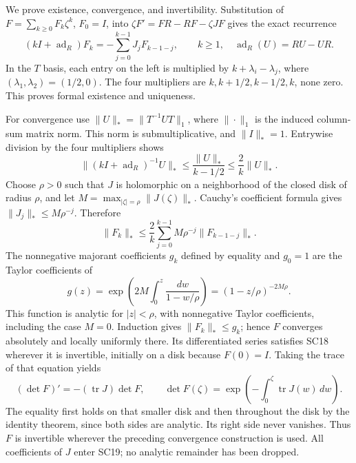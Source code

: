 We prove existence, convergence, and invertibility. Substitution
of \(F=\sum_{k\ge0}F_k\zeta^k\), \(F_0=I\), into
\(\zeta F'=FR-RF-\zeta JF\) gives the exact recurrence
\[
 (kI+\operatorname{ad}_R)F_k
   =-\sum_{j=0}^{k-1}J_jF_{k-1-j},\qquad k\ge1,
 \quad \operatorname{ad}_R(U)=RU-UR .
 \tag{SC19}
\]
In the \(T\) basis, each entry on the left is multiplied by
\(k+\lambda_i-\lambda_j\), where
\((\lambda_1,\lambda_2)=(1/2,0)\). The four multipliers are
\(k,k+1/2,k-1/2,k\), none zero. This proves formal existence
and uniqueness.

For convergence use
\(\|U\|_*=\|T^{-1}UT\|_1\), where \(\|\cdot\|_1\) is the
induced column-sum matrix norm. This norm is submultiplicative,
and \(\|I\|_*=1\). Entrywise division by the four multipliers
shows
\[
 \|(kI+\operatorname{ad}_R)^{-1}U\|_*
 \le\frac{\|U\|_*}{k-1/2}\le\frac2k\|U\|_*.
 \tag{SC20}
\]
Choose \(\rho>0\) such that \(J\) is holomorphic on a neighborhood
of the closed disk of radius \(\rho\), and let
\(M=\max_{|\zeta|=\rho}\|J(\zeta)\|_*\).
Cauchy's coefficient formula gives
\(\|J_j\|_*\le M\rho^{-j}\). Therefore
\[
 \|F_k\|_*\le\frac2k\sum_{j=0}^{k-1}
 M\rho^{-j}\|F_{k-1-j}\|_*.
\]
The nonnegative majorant coefficients \(g_k\) defined by equality
and \(g_0=1\) are the Taylor coefficients of
\[
 g(z)=\exp\!\left(2M\int_0^z\frac{dw}{1-w/\rho}\right)
     =(1-z/\rho)^{-2M\rho}.
 \tag{SC21}
\]
This function is analytic for \(|z|<\rho\), with nonnegative
Taylor coefficients, including the case \(M=0\).
Induction gives \(\|F_k\|_*\le g_k\); hence \(F\) converges
absolutely and locally uniformly there. Its differentiated
series satisfies SC18 wherever it is invertible, initially on
a disk because \(F(0)=I\). Taking the trace of that equation yields
\[
 (\det F)'=-(\operatorname{tr}J)\det F,\qquad
 \det F(\zeta)=
 \exp\!\left(-\int_0^\zeta\operatorname{tr}J(w)\,dw\right).
 \tag{SC22}
\]
The equality first holds on that smaller disk and then throughout
the disk by the identity theorem, since both sides are analytic.
Its right side never vanishes. Thus \(F\) is invertible wherever
the preceding convergence construction is used. All coefficients
of \(J\) enter SC19; no analytic remainder has been dropped.

